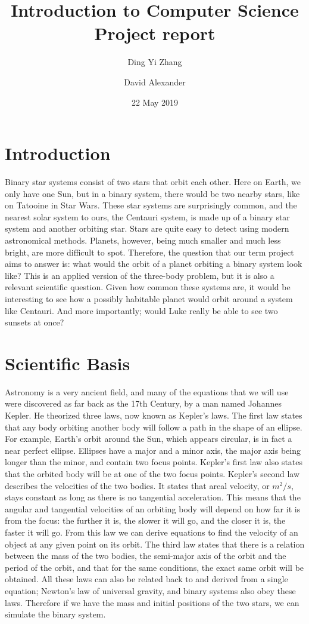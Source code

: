 \documentclass[12pt]{article}
\title{Introduction to Computer Science\\ Project report}
\author{Ding Yi Zhang
\and David Alexander}
\date{22 May 2019}
\begin{document}
\maketitle


\section{Introduction}
Binary star systems consist of two stars that orbit each other. Here on Earth, we only have one Sun, but in a binary system, there would be two nearby stars, like on Tatooine in Star Wars. These star systems are surprisingly common, and the nearest solar system to ours, the Centauri system, is made up of a binary star system and another orbiting star. Stars are quite easy to detect using modern astronomical methods. Planets, however, being much smaller and much less bright, are more difficult to spot. Therefore, the question that our term project aims to answer is: what would the orbit of a planet orbiting a binary system look like? This is an applied version of the three-body problem, but it is also a relevant scientific question. Given how common these systems are, it would be interesting to see how a possibly habitable planet would orbit around a system like Centauri. And more importantly; would Luke really be able to see two sunsets at once?

\section{Scientific Basis}
Astronomy is a very ancient field, and many of the equations that we will use were discovered as far back as the 17th Century, by a man named Johannes Kepler. He theorized three laws, now known as Kepler’s laws. The first law states that any body orbiting another body will follow a path in the shape of an ellipse. For example, Earth’s orbit around the Sun, which appears circular, is in fact a near perfect ellipse. Ellipses have a major and a minor axis, the major axis being longer than the minor, and contain two focus points. Kepler’s first law also states that the orbited body will be at one of the two focus points. Kepler’s second law describes the velocities of the two bodies. It states that areal velocity, or $m^2/s$, stays constant as long as there is no tangential acceleration. This means that the angular and tangential velocities of an orbiting body will depend on how far it is from the focus: the further it is, the slower it will go, and the closer it is, the faster it will go. From this law we can derive equations to find the velocity of an object at any given point on its orbit. The third law states that there is a relation between the mass of the two bodies, the semi-major axis of the orbit and the period of the orbit, and that for the same conditions, the exact same orbit will be obtained. All these laws can also be related back to and derived from a single equation; Newton’s law of universal gravity, and binary systems also obey these laws. Therefore if we have the mass and initial positions of the two stars, we can simulate the binary system.
\end{document}
